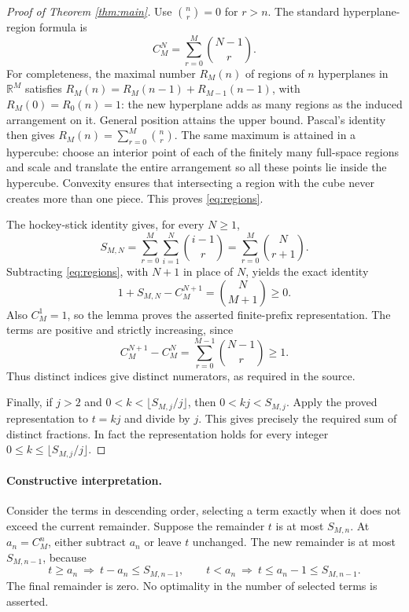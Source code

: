 \documentclass[11pt]{article}
\begin{document}
\begin{proof}[Proof of Theorem \ref{thm:main}]
Use $\binom{n}{r}=0$ for $r>n$. The standard hyperplane-region formula is
\begin{equation}\label{eq:regions}
 C_M^N=\sum_{r=0}^M\binom{N-1}{r}.
\end{equation}
For completeness, the maximal number $R_M(n)$ of regions of $n$
hyperplanes in $\mathbb R^M$ satisfies
$R_M(n)=R_M(n-1)+R_{M-1}(n-1)$, with $R_M(0)=R_0(n)=1$:
the new hyperplane adds as many regions as the induced arrangement
on it. General position attains the upper bound. Pascal's identity
then gives $R_M(n)=\sum_{r=0}^M\binom nr$.
The same maximum is attained in a hypercube: choose an interior point
of each of the finitely many full-space regions and scale and translate
the entire arrangement so all these points lie inside the hypercube.
Convexity ensures that intersecting a region with the cube never
creates more than one piece. This proves \eqref{eq:regions}.

The hockey-stick identity gives, for every $N\geq1$,
\begin{equation}\label{eq:sum}
 S_{M,N}=\sum_{r=0}^M\sum_{i=1}^N\binom{i-1}{r}
        =\sum_{r=0}^M\binom N{r+1}.
\end{equation}
Subtracting \eqref{eq:regions}, with $N+1$ in place of $N$, yields
the exact identity
\begin{equation}\label{eq:gap}
 \boxed{\quad 1+S_{M,N}-C_M^{N+1}=\binom N{M+1}\geq0.\quad}
\end{equation}
Also $C_M^1=1$, so the lemma proves the asserted finite-prefix
representation. The terms are positive and strictly increasing, since
\[
 C_M^{N+1}-C_M^N=\sum_{r=0}^{M-1}\binom{N-1}{r}\geq1.
\]
Thus distinct indices give distinct numerators, as required in the source.

Finally, if $j>2$ and $0<k<\lfloor S_{M,j}/j\rfloor$, then
$0<kj<S_{M,j}$. Apply the proved representation to $t=kj$ and divide
by $j$. This gives precisely the required sum of distinct fractions.
In fact the representation holds for every integer
$0\leq k\leq\lfloor S_{M,j}/j\rfloor$.
\end{proof}

\paragraph{Constructive interpretation.}
Consider the terms in descending order, selecting a term exactly when
it does not exceed the current remainder. Suppose the remainder $t$
is at most $S_{M,n}$. At $a_n=C_M^n$, either subtract $a_n$ or leave
$t$ unchanged. The new remainder is at most $S_{M,n-1}$, because
\[
 t\geq a_n\ \Longrightarrow\ t-a_n\leq S_{M,n-1},
 \qquad
 t<a_n\ \Longrightarrow\ t\leq a_n-1\leq S_{M,n-1}.
\]
The final remainder is zero. No optimality in the number of selected
terms is asserted.
\end{document}

